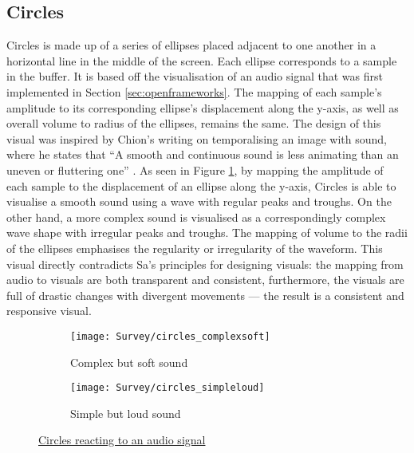 \documentclass[../initial_thesis.tex]{subfiles}
\begin{document}
\subsection{Circles}
Circles is made up of a series of ellipses placed adjacent to one another in a horizontal line in the middle of the screen. Each ellipse corresponds to a sample in the buffer. It is based off the visualisation of an audio signal that was first implemented in Section \ref{sec:openframeworks}. The mapping of each sample's amplitude to its corresponding ellipse's displacement along the y-axis, as well as overall volume to radius of the ellipses, remains the same. The design of this visual was inspired by Chion's writing on temporalising an image with sound, where he states that ``A smooth and continuous sound is less animating than an uneven or fluttering one'' \cite{Chion1994}. As seen in Figure \ref{fig:circles1}, by mapping the amplitude of each sample to the displacement of an ellipse along the y-axis, Circles is able to visualise a smooth sound using a wave with regular peaks and troughs. On the other hand, a more complex sound is visualised as a correspondingly complex wave shape with irregular peaks and troughs. The mapping of volume to the radii of the ellipses emphasises the regularity or irregularity of the waveform. This visual directly contradicts Sa's principles for designing visuals: the mapping from audio to visuals are both transparent and consistent, furthermore, the visuals are full of drastic changes with divergent movements --- the result is a consistent and responsive visual.

\begin{figure}
  \begin{subfigure}{0.5\textwidth}
    \texttt{[image: Survey/circles\_complexsoft]}
    \caption{Complex but soft sound}
  \end{subfigure} 
  \begin{subfigure}{0.5\textwidth}
    \texttt{[image: Survey/circles\_simpleloud]}
    \caption{Simple but loud sound}
  \end{subfigure}
  \caption{\href{https://vimeo.com/326765323}{Circles reacting to an audio signal}}
  \label{fig:circles1}
\end{figure}
\end{document}
